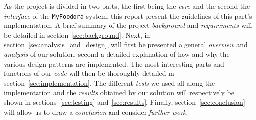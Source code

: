 As the project is divided in two parts, the first being the \emph{core}
and the second the \emph{interface} of the \lstinline|MyFoodora| system,
this report present the guidelines of this part's implementation.
A brief summary of the project \emph{background} and \emph{requirements} will
be detailed in section~\ref{sec:background}.
Next, in section~\ref{sec:analysis_and_design}, will first be presented a general \emph{overview} 
and \emph{analysis} of our solution, second a detailed explanation of how and why
the various design patterns are implemented.
The most interesting parts and functions of our \emph{code} will then be
thoroughly detailed in section~\ref{sec:implementation}.
The different \emph{tests} we used all along the implementation
and the \emph{results} obtained by our solution will respectively
be shown in sections~\ref{sec:testing} and~\ref{sec:results}.
Finally, section~\ref{sec:conclusion} will allow us to draw 
a \emph{conclusion} and consider \emph{further work}.

